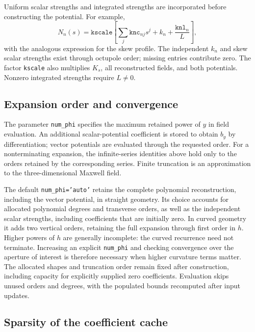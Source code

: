 Uniform scalar strengths and integrated strengths are incorporated before
constructing the potential. For example,
\begin{equation}
 N_n(s)=\texttt{kscale}\left[
 \sum_j\texttt{knc}_{nj}s^j+k_n+\frac{\texttt{knl}_n}{L}\right],
 \label{bfe:total-profile}
\end{equation}
with the analogous expression for the skew profile. The independent
\(k_n\) and skew scalar strengths exist through octupole order; missing
entries contribute zero. The factor \texttt{kscale} also multiplies
\(K_s\), all reconstructed fields, and both potentials. Nonzero integrated
strengths require \(L\ne0\).

\subsection{Expansion order and convergence}

The parameter \texttt{num\_phi} specifies the maximum retained power of
\(y\) in field evaluation. An additional scalar-potential coefficient is
stored to obtain \(b_y\) by differentiation; vector potentials are evaluated
through the requested order. For a nonterminating expansion, the
infinite-series identities above hold only to the orders retained by the
corresponding series. Finite truncation is an approximation to the
three-dimensional Maxwell field.

The default \texttt{num\_phi='auto'} retains the complete polynomial
reconstruction, including the vector potential, in straight geometry. Its
choice accounts for allocated polynomial degrees and transverse orders,
as well as the independent scalar strengths, including coefficients that
are initially zero. In curved geometry it adds two vertical orders, retaining
the full expansion through first order in \(h\). Higher powers of \(h\)
are generally incomplete: the curved recurrence need not terminate.
Increasing an explicit \texttt{num\_phi} and checking convergence over the
aperture of interest is therefore necessary when higher curvature terms matter.
The allocated shapes and truncation order remain fixed after construction,
including capacity for explicitly supplied zero coefficients. Evaluation skips
unused orders and degrees, with the populated bounds recomputed after input
updates.

\subsection{Sparsity of the coefficient cache}

